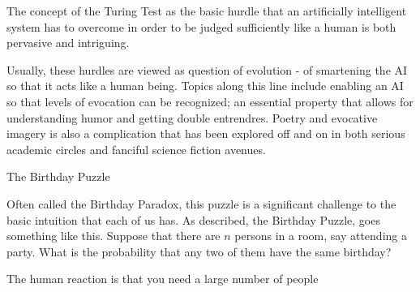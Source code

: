 \documentclass[12pt]{article}
\begin{document}
The concept of the Turing Test as the basic hurdle that an artificially intelligent system has to overcome in order to be judged sufficiently like a human is both pervasive and intriguing.

Usually, these hurdles are viewed as question of evolution - of smartening the AI so that it acts like a human being.  Topics along this line include enabling an AI so that levels of evocation can be recognized; an essential property that allows for understanding humor and getting double entrendres.  Poetry and evocative imagery is also a complication that has been explored off and on in both serious academic circles and fanciful science fiction avenues.   

The Birthday Puzzle

Often called the Birthday Paradox, this puzzle is a significant challenge to the basic intuition that each of us has.  As described, the Birthday Puzzle, goes something like this.  Suppose that there are $n$ persons in a room, say attending a party.  What is the probability that any two of them have the same birthday?

The human reaction is that you need a large number of people 
\end{document}
